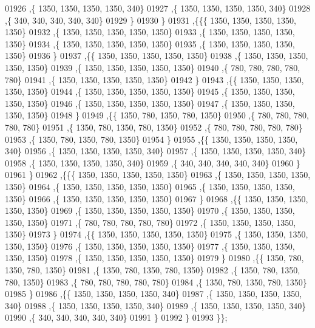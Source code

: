 \begin{DoxyCode}
01926    ,\{  1350,  1350,  1350,  1350,   340\}
01927    ,\{  1350,  1350,  1350,  1350,   340\}
01928    ,\{   340,   340,   340,   340,   340\}
01929    \}
01930   \}
01931  ,\{\{\{  1350,  1350,  1350,  1350,  1350\}
01932    ,\{  1350,  1350,  1350,  1350,  1350\}
01933    ,\{  1350,  1350,  1350,  1350,  1350\}
01934    ,\{  1350,  1350,  1350,  1350,  1350\}
01935    ,\{  1350,  1350,  1350,  1350,  1350\}
01936    \}
01937   ,\{\{  1350,  1350,  1350,  1350,  1350\}
01938    ,\{  1350,  1350,  1350,  1350,  1350\}
01939    ,\{  1350,  1350,  1350,  1350,  1350\}
01940    ,\{   780,   780,   780,   780,   780\}
01941    ,\{  1350,  1350,  1350,  1350,  1350\}
01942    \}
01943   ,\{\{  1350,  1350,  1350,  1350,  1350\}
01944    ,\{  1350,  1350,  1350,  1350,  1350\}
01945    ,\{  1350,  1350,  1350,  1350,  1350\}
01946    ,\{  1350,  1350,  1350,  1350,  1350\}
01947    ,\{  1350,  1350,  1350,  1350,  1350\}
01948    \}
01949   ,\{\{  1350,   780,  1350,   780,  1350\}
01950    ,\{   780,   780,   780,   780,   780\}
01951    ,\{  1350,   780,  1350,   780,  1350\}
01952    ,\{   780,   780,   780,   780,   780\}
01953    ,\{  1350,   780,  1350,   780,  1350\}
01954    \}
01955   ,\{\{  1350,  1350,  1350,  1350,   340\}
01956    ,\{  1350,  1350,  1350,  1350,   340\}
01957    ,\{  1350,  1350,  1350,  1350,   340\}
01958    ,\{  1350,  1350,  1350,  1350,   340\}
01959    ,\{   340,   340,   340,   340,   340\}
01960    \}
01961   \}
01962  ,\{\{\{  1350,  1350,  1350,  1350,  1350\}
01963    ,\{  1350,  1350,  1350,  1350,  1350\}
01964    ,\{  1350,  1350,  1350,  1350,  1350\}
01965    ,\{  1350,  1350,  1350,  1350,  1350\}
01966    ,\{  1350,  1350,  1350,  1350,  1350\}
01967    \}
01968   ,\{\{  1350,  1350,  1350,  1350,  1350\}
01969    ,\{  1350,  1350,  1350,  1350,  1350\}
01970    ,\{  1350,  1350,  1350,  1350,  1350\}
01971    ,\{   780,   780,   780,   780,   780\}
01972    ,\{  1350,  1350,  1350,  1350,  1350\}
01973    \}
01974   ,\{\{  1350,  1350,  1350,  1350,  1350\}
01975    ,\{  1350,  1350,  1350,  1350,  1350\}
01976    ,\{  1350,  1350,  1350,  1350,  1350\}
01977    ,\{  1350,  1350,  1350,  1350,  1350\}
01978    ,\{  1350,  1350,  1350,  1350,  1350\}
01979    \}
01980   ,\{\{  1350,   780,  1350,   780,  1350\}
01981    ,\{  1350,   780,  1350,   780,  1350\}
01982    ,\{  1350,   780,  1350,   780,  1350\}
01983    ,\{   780,   780,   780,   780,   780\}
01984    ,\{  1350,   780,  1350,   780,  1350\}
01985    \}
01986   ,\{\{  1350,  1350,  1350,  1350,   340\}
01987    ,\{  1350,  1350,  1350,  1350,   340\}
01988    ,\{  1350,  1350,  1350,  1350,   340\}
01989    ,\{  1350,  1350,  1350,  1350,   340\}
01990    ,\{   340,   340,   340,   340,   340\}
01991    \}
01992   \}
01993  \}\};
\end{DoxyCode}
